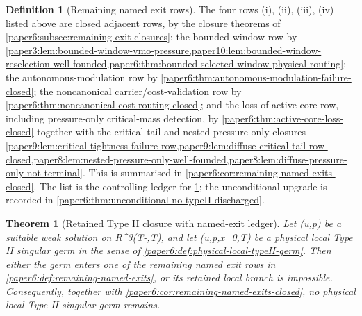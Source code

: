 \documentclass[11pt]{amsart}
\def\({}%
\def\){}%
\def\mathbb#1{#1}%
\theoremstyle{plain}
\newtheorem{theorem}{Theorem}[section]
\theoremstyle{definition}
\newtheorem{definition}[definition]{Definition}
\theoremstyle{remark}
\begin{document}
\begin{definition}[Remaining named exit rows]
\medskip
The four rows \textup{(i)}, \textup{(ii)}, \textup{(iii)}, \textup{(iv)} listed above are
closed adjacent rows, by the closure theorems of
\cref{paper6:subsec:remaining-exit-closures}: the bounded-window row by
\cref{paper3:lem:bounded-window-vmo-pressure,paper10:lem:bounded-window-reselection-well-founded,paper6:thm:bounded-selected-window-physical-routing}; the autonomous-modulation row
by \cref{paper6:thm:autonomous-modulation-failure-closed}; the
noncanonical carrier/cost-validation row by
\cref{paper6:thm:noncanonical-cost-routing-closed}; and the
loss-of-active-core row, including pressure-only critical-mass
detection, by \cref{paper6:thm:active-core-loss-closed} together with the
critical-tail and nested pressure-only closures
\cref{paper9:lem:critical-tightness-failure-row,paper9:lem:diffuse-critical-tail-row-closed,paper8:lem:nested-pressure-only-well-founded,paper8:lem:diffuse-pressure-only-not-terminal}.  This is
summarised in \cref{paper6:cor:remaining-named-exits-closed}.  The list is
the controlling ledger for
\cref{paper6:thm:unconditional-no-typeII}; the unconditional upgrade is recorded in
\cref{paper6:thm:unconditional-no-typeII-discharged}.
\end{definition}

\begin{theorem}[Retained Type II closure with named-exit ledger]
\label{paper6:thm:unconditional-no-typeII}
Let \((u,p)\) be a suitable weak solution on
\(\mathbb R^3\times(T-\delta,T)\), and let
\((u,p,x_0,T)\) be a physical local Type II singular germ in the sense of
\cref{paper6:def:physical-local-typeII-germ}.  Then either the germ enters one
of the remaining named exit rows in
\cref{paper6:def:remaining-named-exits}, or its retained local branch is
impossible.  Consequently, together with
\cref{paper6:cor:remaining-named-exits-closed}, no physical local Type II
singular germ remains.
\end{theorem}
\end{document}
